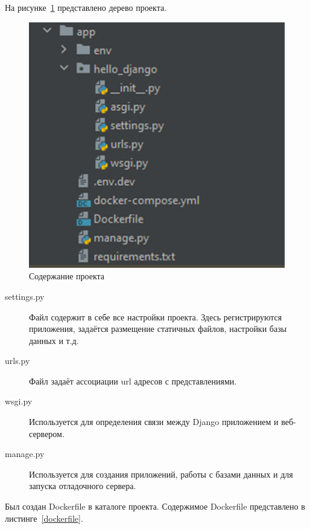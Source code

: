 \def\notedate{2022.10.29}
\def\currentauthor{Василян А.Р. (РК6-73Б)}

На рисунке~\ref{picture1} представлено дерево проекта.
\begin{figure}[!ht]
  \centering
  \includegraphics[scale=0.8]{ResearchNotes/rndhpc_not_gui_2022_10_29/picture1.png}
  \caption{Содержание проекта}
  \label{picture1}
\end{figure}

\begin{description}
	\item[\textsf{settings.py}] Файл содержит в себе все настройки проекта. Здесь регистрируются приложения, задаётся размещение статичных файлов, настройки базы данных и т.д. 
	\item[\textsf{urls.py}] Файл задаёт ассоциации url адресов с представлениями. 
	\item[\textsf{wsgi.py}] Используется для определения связи между Django приложением и веб-сервером.
	\item[\textsf{manage.py}] Используется для создания приложений, работы с базами данных и для запуска отладочного сервера.
\end{description}

	Был создан \textsf{Dockerfile} в каталоге проекта. Содержимое \textsf{Dockerfile} представлено в листинге~\ref{dockerfile}.

